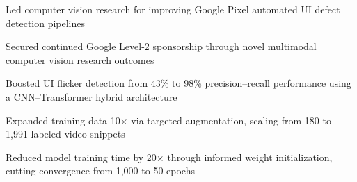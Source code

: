 \begin{cventries}
{      %
      \begin{cvitems} %
        \item {Led computer vision research for improving Google Pixel automated UI defect detection pipelines}
        \item {Secured continued Google Level-2 sponsorship through novel multimodal computer vision research outcomes}
        \item {Boosted UI flicker detection from 43\% to 98\% precision–recall performance using a CNN–Transformer hybrid architecture}
        \item {Expanded training data 10$\times$ via targeted augmentation, scaling from 180 to 1,991 labeled video snippets}
        \item {Reduced model training time by 20$\times$ through informed weight initialization, cutting convergence from 1,000 to 50 epochs}
      \end{cvitems}
    }

\end{cventries}
